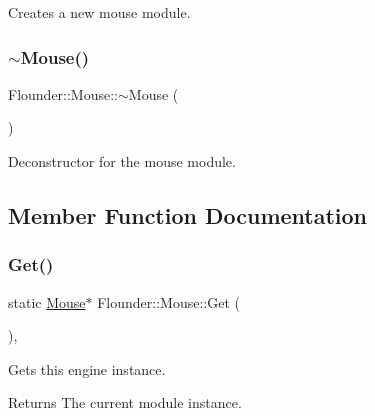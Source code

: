 Creates a new mouse module. 

\mbox{\label{class_flounder_1_1_mouse_a4511fba832387f2406fface9b5e3a383}} 
\subsubsection{\texorpdfstring{$\sim$\+Mouse()}{~Mouse()}}
{\footnotesize\ttfamily Flounder\+::\+Mouse\+::$\sim$\+Mouse (\begin{DoxyParamCaption}{ }\end{DoxyParamCaption})}



Deconstructor for the mouse module. 



\subsection{Member Function Documentation}
\mbox{\label{class_flounder_1_1_mouse_a7a3bad91ffda3a5c1eb0ce2408225f7d}} 
\subsubsection{\texorpdfstring{Get()}{Get()}}
{\footnotesize\ttfamily static \hyperlink{class_flounder_1_1_mouse}{Mouse}$\ast$ Flounder\+::\+Mouse\+::\+Get (\begin{DoxyParamCaption}{ }\end{DoxyParamCaption})\hspace{0.3cm}{\ttfamily [inline]}, {\ttfamily [static]}}



Gets this engine instance. 

\begin{DoxyReturn}{Returns}
The current module instance. 
\end{DoxyReturn}
\mbox{\label{class_flounder_1_1_mouse_af5b6662f025bb838baca473855444db1}} 
